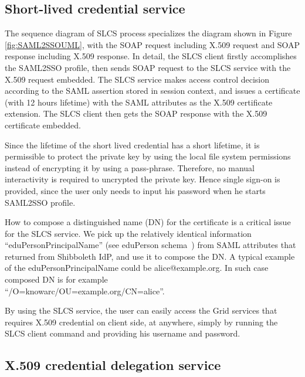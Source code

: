 \documentclass[conference]{IEEEtran}
\begin{document}
\subsection{Short-lived credential service}
\label{sec:slcs}
The sequence diagram of SLCS process specializes the diagram shown in Figure \ref{fig:SAML2SSOUML}, 
with the SOAP request including X.509 request and SOAP response including X.509 response. 
In detail, the SLCS client firstly accomplishes the SAML2SSO profile, then sends 
SOAP request to the SLCS service with the X.509 request embedded. The SLCS service makes
access control decision according to the SAML assertion stored in session context, and issues 
a certificate (with 12 hours lifetime) with the SAML attributes as the X.509 certificate 
extension. The SLCS client then gets the SOAP response with the X.509 certificate embedded.

Since the lifetime of the short lived credential has a short lifetime, it is permissible to protect 
the private key by using the local file system permissions instead of encrypting it by 
using a pass-phrase. Therefore, no manual interactivity is required to uncrypted the private
key. Hence single sign-on is provided, since the user only needs to input his password when 
he starts SAML2SSO profile.

How to compose a distinguished name (DN) for the certificate is a critical issue for 
the SLCS service. We pick up the relatively identical information ``eduPersonPrincipalName'' 
(see eduPerson schema~\cite{eduSchemalink}) from SAML attributes that returned from Shibboleth
IdP, and use it to compose the DN. A typical example of the eduPersonPrincipalName 
could be alice@example.org. In such case composed DN is for example\\``/O=knowarc/OU=example.org/CN=alice''.

By using the SLCS service, the user can easily access the Grid services that requires 
X.509 credential on client side, at anywhere, simply by running the SLCS client command 
and providing his username and password.

\subsection{X.509 credential delegation service}
\label{sec:creddeleg}
\end{document}
